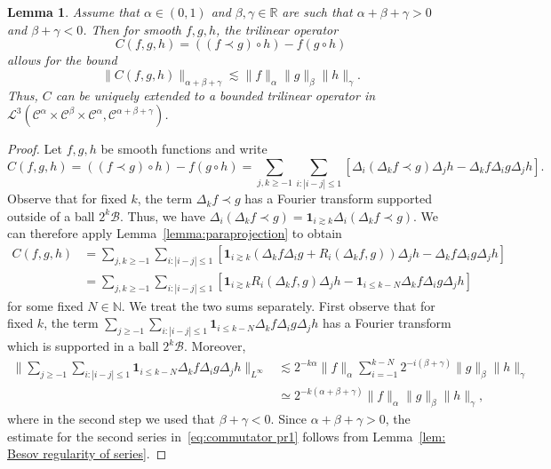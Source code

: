 \documentclass[11pt,a4paper]{article}
\newtheorem{lemma}[theorem]{Lemma}
\theoremstyle{remark}
\newcommand{\Lcal}{\mathcal{L}}
\newcommand{\CB}{\ensuremath{\mathscr{B}}}
\newcommand{\CC}{\ensuremath{\mathscr{C}}}
\begin{document}
\begin{lemma}\label{lemma:commutator}
   Assume that $\alpha \in ( 0,1 )$ and $\beta , \gamma \in \mathbb{R}$ are such that $\alpha + \beta + \gamma >0$ and $\beta + \gamma <0$. Then for smooth $f,g,h$, the trilinear operator
  \[
     C ( f,g,h ) = ( ( f \prec g ) \circ h ) -f ( g \circ h )
  \]
  allows for the bound
  \[
     \| C ( f,g,h ) \|_{\alpha + \beta + \gamma} \lesssim \| f \|_{\alpha} \|  g \|_{\beta} \| h \|_{\gamma} .
  \]
  Thus, $C$ can be uniquely extended to a bounded trilinear operator in $\Lcal^{3} \left( \CC^{\alpha}\! \times\! \CC^{\beta}\! \times\! \CC^{\alpha}, \CC^{\alpha + \beta + \gamma} \right)$.
\end{lemma}

\begin{proof}
  Let $f,g,h$ be smooth functions and write
  \[
     C ( f,g,h ) = ( ( f \prec g ) \circ h ) -f ( g \circ h ) = \sum_{j,k  \geqslant -1} \sum_{i: | i-j | \leqslant 1} [ \Delta_{i} ( \Delta_{k} f  \prec g ) \Delta_{j} h- \Delta_{k} f \Delta_{i} g \Delta_{j} h ].
  \]
  Observe that for fixed $k$, the term $\Delta_{k} f \prec g$ has a Fourier transform supported outside of a ball $2^{k} \CB$. Thus, we have $\Delta_{i}( \Delta_{k} f \prec g ) = \mathbf{1}_{i \gtrsim k} \Delta_{i} ( \Delta_{k}f \prec g )$. We can therefore apply Lemma~\ref{lemma:paraprojection} to obtain
  \begin{align}\label{eq:commutator pr1}\nonumber
     C ( f,g,h ) &= \sum_{j,k \geqslant -1} \sum_{i: | i-j | \leqslant 1} [\mathbf{1}_{i \gtrsim k} ( \Delta_{k} f \Delta_{i} g+R_{i} ( \Delta_{k} f,g ) ) \Delta_{j} h- \Delta_{k} f \Delta_{i} g \Delta_{j} h] \\
    &= \sum_{j,k \geqslant -1} \sum_{i: | i-j | \leqslant 1} [\mathbf{1}_{i \gtrsim k} R_{i} ( \Delta_{k} f,g ) \Delta_{j} h -  \mathbf{1}_{i \leqslant k-N} \Delta_{k} f \Delta_{i} g \Delta_{j} h]
  \end{align}
  for some fixed $N \in \mathbb{N}$. We treat the two sums separately. First
  observe that for fixed $k$, the term $\sum_{j \geqslant -1} \sum_{i: | i-j | \leqslant 1} \mathbf{1}_{i \leqslant k-N} \Delta_{k} f \Delta_{i} g \Delta_{j} h$ has a
  Fourier transform which is supported in a ball $2^{k} \CB$.
  Moreover,
  \begin{align*}
     \Bigg\| \sum_{j \geqslant -1} \sum_{i: | i-j | \leqslant 1} \mathbf{1}_{i \leqslant k-N} \Delta_{k} f \Delta_{i} g \Delta_{j} h \Bigg\|_{L^{\infty}} & \lesssim 2^{-k \alpha} \| f \|_{\alpha} \sum_{i=-1}^{k-N} 2^{-i ( \beta + \gamma)} \| g \|_{\beta} \| h \|_{\gamma} \\
     & \simeq 2^{-k ( \alpha + \beta + \gamma )} \| f \|_{\alpha} \| g \|_{\beta} \| h \|_{\gamma},
  \end{align*}
  where in the second step we used that $\beta + \gamma <0$. Since $\alpha +  \beta + \gamma >0$, the estimate for the second series
  in~{\eqref{eq:commutator pr1}} follows from Lemma~\ref{lem: Besov regularity of series}.
  

\end{proof}
\end{document}
